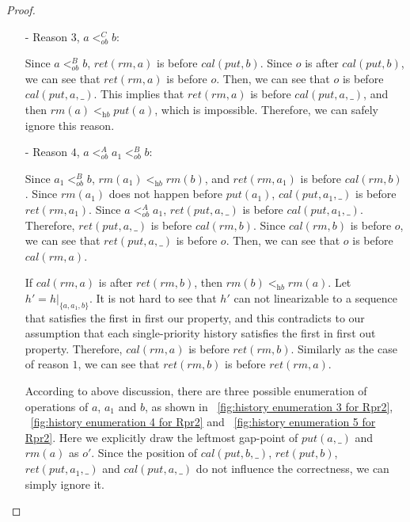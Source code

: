 \begin {proof}
\begin{itemize}
\item[-] Reason $3$, $a <_{\textit{ob}}^C b$:

    Since $a <_{\textit{ob}}^B b$, $\textit{ret}(\textit{rm},a)$ is before $\textit{cal}(\textit{put},b)$. Since $o$ is after $\textit{cal}(\textit{put},b)$, we can see that $\textit{ret}(\textit{rm},a)$ is before $o$. Then, we can see that $o$ is before $\textit{cal}(\textit{put},a,\_)$. This implies that $\textit{ret}(\textit{rm},a)$ is before $\textit{cal}(\textit{put},a,\_)$, and then $\textit{rm}(a) <_{\textit{hb}} \textit{put}(a)$, which is impossible. Therefore, we can safely ignore this reason.

\item[-] Reason $4$, $a <_{\textit{ob}}^A a_1 <_{\textit{ob}}^B b$:

    Since $a_1 <_{\textit{ob}}^B b$, $\textit{rm}(a_1) <_{\textit{hb}} \textit{rm}(b)$, and $\textit{ret}(\textit{rm},a_1)$ is before $\textit{cal}(\textit{rm},b)$. Since $\textit{rm}(a_1)$ does not happen before $\textit{put}(a_1)$, $\textit{cal}(\textit{put},a_1,\_)$ is before $\textit{ret}(\textit{rm},a_1)$. Since $a <_{\textit{ob}}^A a_1$, $\textit{ret}(\textit{put},a,\_)$ is before $\textit{cal}(\textit{put},a_1,\_)$. Therefore, $\textit{ret}(\textit{put},a,\_)$ is before $\textit{cal}(\textit{rm},b)$. Since $\textit{cal}(\textit{rm},b)$ is before $o$, we can see that $\textit{ret}(\textit{put},a,\_)$ is before $o$. Then, we can see that $o$ is before $\textit{cal}(\textit{rm},a)$.

    If $\textit{cal}(\textit{rm},a)$ is after $\textit{ret}(\textit{rm},b)$, then $\textit{rm}(b) <_{\textit{hb}} \textit{rm}(a)$. Let $h' = h \vert_{ \{ a,a_1,b \} }$. It is not hard to see that $h'$ can not linearizable to a sequence that satisfies the first in first our property, and this contradicts to our assumption that each single-priority history satisfies the first in first out property. Therefore, $\textit{cal}(\textit{rm},a)$ is before $\textit{ret}(\textit{rm},b)$. Similarly as the case of reason $1$, we can see that $\textit{ret}(\textit{rm},b)$ is before $\textit{ret}(\textit{rm},a)$.

    According to above discussion, there are three possible enumeration of operations of $a$, $a_1$ and $b$, as shown in \figurename~\ref{fig:history enumeration 3 for Rpr2}, \figurename~\ref{fig:history enumeration 4 for Rpr2} and \figurename~\ref{fig:history enumeration 5 for Rpr2}. Here we explicitly draw the leftmost gap-point of $\textit{put}(a,\_)$ and $\textit{rm}(a)$ as $o'$. Since the position of $\textit{cal}(\textit{put},b,\_)$, $\textit{ret}(\textit{put},b)$, $\textit{ret}(\textit{put},a_1,\_)$ and $\textit{cal}(\textit{put},a,\_)$ do not influence the correctness, we can simply ignore it.


\end{itemize}
\end{proof}
